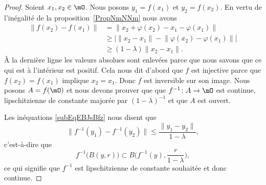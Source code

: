 \begin{proof}
	Soient \( x_1,x_2\in\mO\). Nous posons \( y_1=f(x_1)\) et \( y_2=f(x_2)\). En vertu de l'inégalité de la proposition~\ref{PropNmNNm} nous avons
	\begin{subequations}      \label{subEqEBJsBfz}
		\begin{align}
			\big\| f(x_2)-f(x_1) \big\| & =   \big\| x_2+\varphi(x_2)-x_1-\varphi(x_1) \big\|                     \\
			                            & \geq  \Big| \| x_2-x_1 \|-\big\| \varphi(x_2)-\varphi(x_1) \big\| \Big| \\
			                            & \geq  (1-\lambda)\| x_2-x_1 \|.
		\end{align}
	\end{subequations}
	À la dernière ligne les valeurs absolues sont enlevées parce que nous savons que ce qui est à l'intérieur est positif. Cela nous dit d'abord que \( f\) est injective parce que \( f(x_2)=f(x_1)\) implique \( x_2=x_1\). Donc \( f\) est inversible sur son image. Nous posons \( A=f(\mO)\) et nous devons prouver que que \( f^{-1}\colon A\to \mO\) est continue, lipschitzienne de constante majorée par \( (1-\lambda)^{-1}\) et que \( A\) est ouvert.

	Les inéquations \eqref{subEqEBJsBfz} nous disent que
	\begin{equation}
		\big\| f^{-1}(y_1)-f^{-1}(y_2) \big\|\leq \frac{ \| y_1-y_2 \| }{ 1-\lambda },
	\end{equation}
	c'est-à-dire que
	\begin{equation}
		f^{-1}\big( B(y,r) \big)\subset B\big( f^{-1}(y),\frac{ r }{ 1-\lambda } \big),
	\end{equation}
	ce qui signifie que \( f^{-1}\) est lipschitzienne de constante souhaitée et donc continue.


\end{proof}
